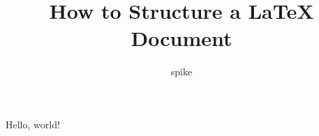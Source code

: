 \documentclass{article}
\begin{document}
\title{How to Structure a \LaTeX{} Document}
\author{spike}
Hello, world!
\end{document}

